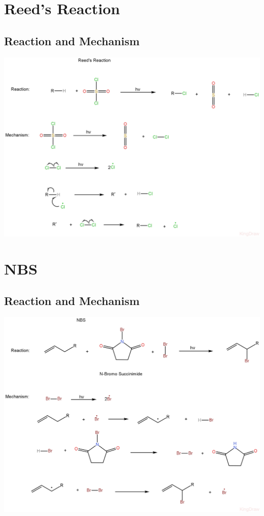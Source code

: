\documentclass{article}
\begin{document}
\section{Reed's Reaction}
\subsection{Reaction and Mechanism}
\begin{center}
    \includegraphics[scale=0.22]{Reed'sReaction_1722185097608.JPEG}
\end{center}

\section{NBS}
\subsection{Reaction and Mechanism}
\begin{center}
    \includegraphics[scale=0.22]{NBS.JPEG}
\end{center}
\end{document}
